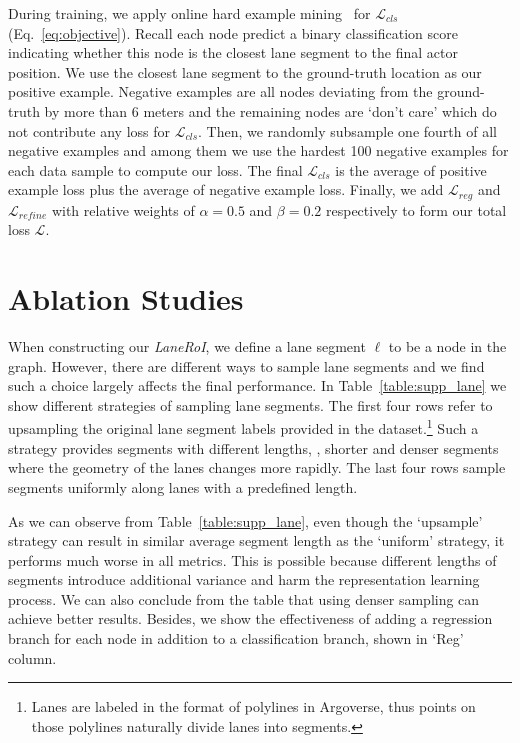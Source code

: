 During training, we apply online hard example mining~\cite{ohem} for
$\mathcal{L}_{cls}$ (Eq.~\ref{eq:objective}). Recall each node predict a binary classification score
indicating whether this node is the closest lane segment to the final actor
position. We use the closest lane segment to the ground-truth location as our
positive example. Negative examples are all nodes deviating from the
ground-truth by more than 6 meters and the remaining nodes are `don't care' which do
not contribute any loss for $\mathcal{L}_{cls}$. Then, we randomly subsample one
fourth of all negative examples and among them we use the hardest 100 negative
examples for each data sample to compute our loss. The final $\mathcal{L}_{cls}$
is the average of positive example loss plus the average of negative example
loss. Finally, we add $\mathcal{L}_{reg}$ and $\mathcal{L}_{refine}$ with
relative weights of $\alpha = 0.5$ and $\beta = 0.2$ respectively to form our
total loss $\mathcal{L}$.

\section{Ablation Studies}
\label{sec:supp_ablation}
When constructing our \textit{LaneRoI}, we define a lane segment $\ell$ to be a node in the
graph. However, there are different ways to sample lane segments and we find
such a choice largely affects the final performance. In
Table~\ref{table:supp_lane} we show different strategies of sampling lane segments.
The first four rows refer to upsampling the original lane segment labels
provided in the dataset.\footnote{Lanes are labeled in the format of polylines
in Argoverse, thus points on those polylines naturally divide lanes into
segments.} Such a strategy provides segments with different lengths, \eg, shorter
and denser segments where the geometry of the lanes changes more rapidly. The
last four rows sample segments uniformly along lanes with a predefined length.

As we can observe from Table~\ref{table:supp_lane}, even though the `upsample' strategy
can result in similar average segment length as the `uniform' strategy, it
performs much worse in all metrics. This is possible because different lengths of
segments introduce additional variance and harm the representation learning
process. We can also conclude from the table that using denser sampling can
achieve better results. Besides, we show the effectiveness of adding a
regression branch for each node in addition to a classification branch, shown in
`Reg' column. 


